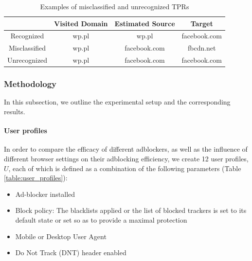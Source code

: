 \documentclass{sig-alternate}
\begin{document}
\begin{table}
\centering
\small
\begin{tabular}{|c|c c c|}
\hline
& Visited Domain & Estimated Source & Target \\
\hline
Recognized & wp.pl & wp.pl & facebook.com \\
Misclassified & wp.pl & facebook.com & fbcdn.net \\
Unrecognized & wp.pl & facebook.com & facebook.com \\
\hline
\end{tabular}
\caption{Examples of misclassified and unrecognized TPRs}
\label{table:false_positive_examples}
\end{table}

\subsubsection{Methodology}
In this subsection, we outline the experimental setup and the corresponding results.

\paragraph{User profiles}
\label{sec:user_profiles}
In order to compare the efficacy of different adblockers, as well as the influence of different browser settings on their adblocking efficiency, we create 12 user profiles, $U$, each of which is defined as a combination of the following parameters (Table \ref{table:user_profiles}):

\begin{itemize}
 \item Ad-blocker installed
 \item Block policy: The blacklists applied or the list of blocked trackers is set to its default state or set so as to provide a maximal protection
 \item Mobile or Desktop User Agent
 \item Do Not Track (DNT) header enabled
\end{itemize}
\end{document}
